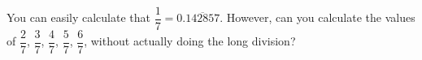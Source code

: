 
%
%
%
%
% 

\question[3] You can easily calculate that $\dfrac{1}{7}=0.\overline{142857}$. However, can you calculate the values of $\dfrac{2}{7}$, $\dfrac{3}{7}$, $\dfrac{4}{7}$, $\dfrac{5}{7}$, $\dfrac{6}{7}$, without actually doing the long division?

